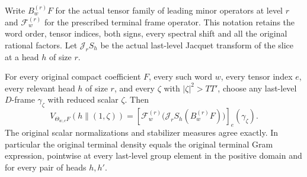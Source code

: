 Write $B_w^{(r)}F$ for the actual tensor family of leading
minor operators at level $r$ and $\mathcal F_w^{(r)}$ for
the prescribed terminal frame operator.  This notation
retains the word order, tensor indices, both signs, every
spectral shift and all the original rational factors.
Let $\mathcal J_rS_h$ be the actual last-level Jacquet
transform of the slice at a head $h$ of size $r$.

\begin{theorem}\label{terminal-transfer-every-head}
For every original compact coefficient $F$, every such word
$w$, every tensor index $e$, every relevant head $h$ of size
$r$, and every $\zeta$ with $|\zeta|^2>TT'$, choose any
last-level $D$-frame $\gamma_\zeta$ with reduced scalar
$\zeta$.  Then
\begin{equation}\label{terminal-transfer-vector}
 V_{\Theta_{w,e}F}(h\mathbin{\|}(1,\zeta))
   =\left[\mathcal F_w^{(r)}
           \bigl(\mathcal J_rS_h(B_w^{(r)}F)\bigr)\right]_e
                                                  (\gamma_\zeta).
\end{equation}
The original scalar normalizations and stabilizer measures
agree exactly.  In particular the original terminal
density equals the original terminal Gram expression,
pointwise at every last-level group element in the positive
domain and for every pair of heads $h,h'$.
\end{theorem}

